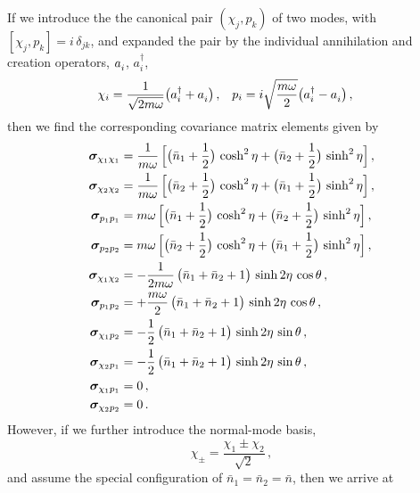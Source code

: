 \documentclass[11pt,a4paper]{article}
\begin{document}
If we introduce the the canonical pair $(\chi_j,p_k)$ of two modes, with $[\chi_j,p_k]=i\,\delta_{jk}$, and expanded the pair by the individual annihilation and creation operators, $a_i^{\vphantom{\dagger}}$, $a_i^{\dagger}$,
\begin{align}
	\chi_{i}&=\frac{1}{\sqrt{2m\omega}}\bigl(a_{i}^{\dagger}+a_{i}^{\vphantom{\dagger}}\bigr)\,, &p_{i}&=i\sqrt{\frac{m\omega}{2}}\bigl(a_{i}^{\dagger}-a_{i}^{\vphantom{\dagger}}\bigr)\,,
\end{align}
then we find the corresponding covariance matrix elements given by
\begin{align}
	\bm{\sigma}_{\chi_1\chi_1}&=\frac{1}{m\omega}\,\Bigl[\bigl(\bar{n}_{1}+\frac{1}{2}\bigr)\,\cosh^{2}\eta+\bigl(\bar{n}_{2}+\frac{1}{2}\bigr)\,\sinh^{2}\eta\Bigr]\,,\label{E:bsgvsj1}\\
	\bm{\sigma}_{\chi_2\chi_2}&=\frac{1}{m\omega}\,\Bigl[\bigl(\bar{n}_{2}+\frac{1}{2}\bigr)\,\cosh^{2}\eta+\bigl(\bar{n}_{1}+\frac{1}{2}\bigr)\,\sinh^{2}\eta\Bigr]\,,\\
	\bm{\sigma}_{p_1p_1}&=m\omega\,\Bigl[\bigl(\bar{n}_{1}+\frac{1}{2}\bigr)\,\cosh^{2}\eta+\bigl(\bar{n}_{2}+\frac{1}{2}\bigr)\,\sinh^{2}\eta\Bigr]\,,\\
	\bm{\sigma}_{p_2p_2}&=m\omega\,\Bigl[\bigl(\bar{n}_{2}+\frac{1}{2}\bigr)\,\cosh^{2}\eta+\bigl(\bar{n}_{1}+\frac{1}{2}\bigr)\,\sinh^{2}\eta\Bigr]\,,\\
	\bm{\sigma}_{\chi_1\chi_2}&=-\frac{1}{2m\omega}\,\bigl(\bar{n}_{1}+\bar{n}_{2}+1\bigr)\,\sinh2\eta\,\cos\theta\,,\\
	\bm{\sigma}_{p_1p_2}&=+\frac{m\omega}{2}\,\bigl(\bar{n}_{1}+\bar{n}_{2}+1\bigr)\,\sinh2\eta\,\cos\theta\,,\\
	\bm{\sigma}_{\chi_1p_2}&=-\frac{1}{2}\,\bigl(\bar{n}_{1}+\bar{n}_{2}+1\bigr)\,\sinh2\eta\,\sin\theta\,,\\
	\bm{\sigma}_{\chi_2p_1}&=-\frac{1}{2}\,\bigl(\bar{n}_{1}+\bar{n}_{2}+1\bigr)\,\sinh2\eta\,\sin\theta\,,\\
	\bm{\sigma}_{\chi_1p_1}&=0\,,\\
	\bm{\sigma}_{\chi_2p_2}&=0\,.\label{E:bsgvsj10}
\end{align}
However, if we further introduce the normal-mode basis,
\begin{equation}
	\chi_{\pm}=\frac{\chi_{1}\pm\chi_{2}}{\sqrt{2}}\,,
\end{equation}
and assume the special configuration of $\bar{n}_{1}=\bar{n}_{2}=\bar{n}$, then we arrive at
\end{document}
